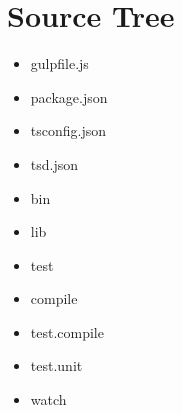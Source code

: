\section{Source Tree}


\begin{itemize}
  \item gulpfile.js
  \item package.json
  \item tsconfig.json
  \item tsd.json
\end{itemize}


\begin{itemize}
  \item bin
  \item lib
  \item test
\end{itemize}


\begin{itemize}
  \item compile
  \item test.compile
  \item test.unit
  \item watch
\end{itemize}








